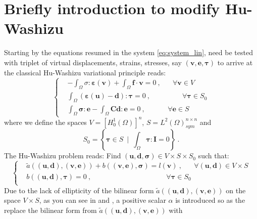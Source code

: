\documentclass[preprint,12pt,authoryear]{elsarticle}
\begin{document}
\section{Briefly introduction to modify Hu-Washizu}\label{sec:three}
Starting by the equations resumed in the system \eqref{eq:system_lin},
need be tested with triplet of virtual displacements, strains, stresses, say 
$\left(\bm{v}, \bm{e},\bm{\tau}\right)$ to arrive at the classical Hu-Washizu variational principle reads: 
\begin{equation}\label{eq:system_hw}
\left\lbrace
\begin{split}
&-\int_{\Omega} \sigma : \bm{\varepsilon}(\bm{v}) + \int_{\Omega} \bm{f}\cdot\bm{v} = 0\:, \hspace{20pt} \forall\bm{v}\in V \\
&\int_{\Omega} \left( \bm{\varepsilon}(\bm{u}) - 
\bm{d} \right):\bm{\tau} = 0\:, \hspace{54pt} \forall\bm{\tau}\in S_{0} \\
&\int_{\Omega} \bm{\sigma}:\bm{e} - 
\int_{\Omega}\bm{\mathbf{C}}\bm{d}:\bm{e} = 0\:, 
\hspace{38pt} \forall\bm{e}\in S
\end{split}
\right.
\end{equation}
where we define the spaces $V=\left[H^{1}_{0}(\Omega)\right]^{n}$, $S=L^{2}(\Omega)^{n\times n}_{sym}$ and
\begin{equation}
S_{0} = \left\lbrace \bm{\tau}\in S \: \mid \: \int_{\Omega}\bm{\tau}:\bm{I} = 0\right\rbrace\:. 
\end{equation} 
The Hu-Washizu problem reads: Find $\left(\bm{u}, \bm{d},\bm{\sigma}\right)\in V\times S\times S_{0}$ such that:
\begin{equation} \label{eq:system_hw_compact}
\left\lbrace
\begin{split}
& \tilde{a}( (\bm{u},\bm{d}), (\bm{v}, \bm{e}) ) 
+ b( (\bm{v}, \bm{e}), \bm{\sigma} ) = l(\bm{v})\:, 
\hspace{20pt} \forall \left(\bm{u},\bm{d}\right)\in V \times S \\
& b( (\bm{u},\bm{d}), \bm{\tau} ) = 0\:, 
\hspace{127pt} \forall\bm{\tau}\in S_{0} \\
\end{split}
\right.
\end{equation}
Due to the lack of ellipticity of the bilinear form $\tilde{a}( (\bm{u},\bm{d}), (\bm{v}, \bm{e}) )$ on the space $V\times S$, as you can see in \cite{lamichhane_three} and \cite{lamichhane_huwashizu}, a positive scalar $\alpha$ is introduced so as the replace the bilinear form from $\tilde{a}( (\bm{u},\bm{d}), (\bm{v}, \bm{e}) )$ with
\end{document}
